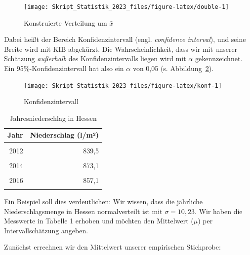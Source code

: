 \documentclass[
  11pt,
  ngerman,
  a4paper,
]{report}
\begin{document}
\begin{figure}[!h]

{\centering \texttt{[image: Skript\_Statistik\_2023\_files/figure-latex/double-1]} 

}

\caption{Konstruierte Verteilung um $\bar{x}$}\label{fig:double}
\end{figure}

Dabei heißt der Bereich Konfidenzintervall (engl. \emph{confidence interval}), und seine Breite wird mit \(\textrm{KIB}\) abgekürzt. Die Wahrscheinlichkeit, dass wir mit unserer Schätzung \emph{außerhalb} des Konfidenzintervalls liegen wird mit \(\alpha\) gekennzeichnet. Ein 95\%-Konfidenzintervall hat also ein \(\alpha\) von 0,05 (s. Abbildung~\ref{fig:konf}).

\begin{figure}[!h]

{\centering \texttt{[image: Skript\_Statistik\_2023\_files/figure-latex/konf-1]} 

}

\caption{Konfidenzintervall}\label{fig:konf}
\end{figure}

\begin{table}

\caption{\label{tab:tab}Jahresniederschlag in Hessen}
\centering
\begin{tabular}[t]{rr}
\toprule
\textbf{Jahr} & \textbf{Niederschlag (l/m²)}\\
\midrule
\cellcolor{gray!6}{2011} & \cellcolor{gray!6}{855,3}\\
2012 & 839,5\\
\cellcolor{gray!6}{2013} & \cellcolor{gray!6}{850,6}\\
2014 & 873,1\\
\cellcolor{gray!6}{2015} & \cellcolor{gray!6}{858,3}\\
2016 & 857,1\\
\cellcolor{gray!6}{2017} & \cellcolor{gray!6}{861,4}\\
\bottomrule
\end{tabular}
\end{table}

Ein Beispiel soll dies verdeutlichen: Wir wissen, dass die jährliche Niederschlagsmenge in Hessen normalverteilt ist mit \(\sigma=10{,}23\). Wir haben die Messwerte in Tabelle 1 erhoben und möchten den Mittelwert (\(\mu\)) per Intervallschätzung angeben.

Zunächst errechnen wir den Mittelwert unserer empirischen Stichprobe:
\end{document}
